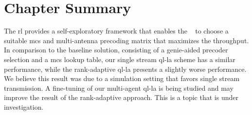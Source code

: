 \section{Chapter Summary}
\label{sec:la-conclusion}
The \gls{rl} provides a self-exploratory framework that enables the \base~ to choose a suitable \gls{mcs} and multi-antenna precoding matrix that maximizes the throughput.
%
%
In comparison to the baseline solution, consisting of a genie-aided precoder selection and a \gls{mcs} lookup table, our single stream \gls{ql-la} scheme has a similar performance, while the rank-adaptive \gls{ql-la} presents a slightly worse performance.
%
We believe this result was due to a simulation setting that favors single stream transmission.
%
A fine-tuning of our multi-agent \gls{ql-la} is being studied and may improve the result of the rank-adaptive approach.
%
This is a topic that is under investigation.

%
